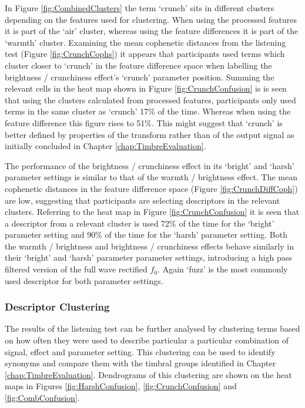 			In Figure \ref{fig:CombinedClusters} the term `crunch' sits in different clusters depending on the
			features used for clustering. When using the processed features it is part of the `air' cluster,
			whereas using the feature differences it is part of the `warmth' cluster. Examining the mean
			cophenetic distances from the listening test (Figure \ref{fig:CrunchCophs}) it appears that
			participants used terms which cluster closer to `crunch' in the feature difference space when
			labelling the brightness / crunchiness effect's `crunch' parameter position. Summing the relevant
			cells in the heat map shown in Figure \ref{fig:CrunchConfusion} is is seen that using the clusters
			calculated from processed features, participants only used terms in the same cluster as `crunch'
			17\% of the time. Whereas when using the feature difference this figure rises to 51\%. This might
			suggest that `crunch' is better defined by properties of the transform rather than of the output
			signal as initially concluded in Chapter \ref{chap:TimbreEvaluation}.

			The performance of the brightness / crunchiness effect in its `bright' and `harsh' parameter
			settings is similar to that of the warmth / brightness effect. The mean cophenetic distances in the
			feature difference space (Figure \ref{fig:CrunchDiffCoph}) are low, suggesting that participants
			are selecting descriptors in the relevant clusters. Referring to the heat map in Figure
			\ref{fig:CrunchConfusion} it is seen that a descriptor from a relevant cluster is used 72\% of the
			time for the `bright' parameter setting and 90\% of the time for the `harsh' parameter setting.
			Both the warmth / brightness and brightness / crunchiness effects behave similarly in their
			`bright' and `harsh' parameter parameter settings, introducing a high pass filtered version of the
			full wave rectified $f_{0}$. Again `fuzz' is the most commonly used descriptor for both parameter
			settings.

		\subsubsection*{Descriptor Clustering}
			The results of the listening test can be further analysed by clustering terms based on how often
			they were used to describe particular a particular combination of signal, effect and parameter
			setting. This clustering can be used to identify synonyms and compare them with the timbral groups
			identified in Chapter \ref{chap:TimbreEvaluation}. Dendrograms of this clustering are shown on the
			heat maps in Figures \ref{fig:HarshConfusion}, \ref{fig:CrunchConfusion} and
			\ref{fig:CombConfusion}.

